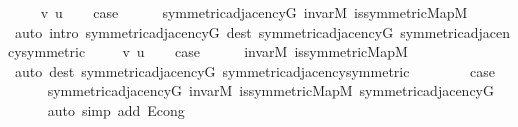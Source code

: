 \begin{isabellebody}
\ \ \isamarkupfalse%
\ {\isacharparenleft}{\kern0pt}{}\ v\ u{\isacharparenright}{\kern0pt}\isanewline
\ \ \isamarkupfalse%
\ {\isacharquery}{\kern0pt}case\isanewline
\ \ \ \ \isamarkupfalse%
\ symmetric{\isacharunderscore}{\kern0pt}adjacency{\isacharunderscore}{\kern0pt}G\ invar{\isacharunderscore}{\kern0pt}M\ is{\isacharunderscore}{\kern0pt}symmetric{\isacharunderscore}{\kern0pt}Map{\isacharunderscore}{\kern0pt}M\isanewline
\ \ \ \ \isamarkupfalse%
\ {\isacharparenleft}{\kern0pt}auto\ intro{\isacharcolon}{\kern0pt}\ symmetric{\isacharunderscore}{\kern0pt}adjacency{\isacharunderscore}{\kern0pt}G{}\ dest{\isacharcolon}{\kern0pt}\ symmetric{\isacharunderscore}{\kern0pt}adjacency{\isacharunderscore}{\kern0pt}G{}\ symmetric{\isacharunderscore}{\kern0pt}adjacency{\isachardot}{\kern0pt}symmetric{\isacharparenright}{\kern0pt}\isanewline
{}\isamarkupfalse%
\isanewline
\ \ \isamarkupfalse%
\ {\isacharparenleft}{\kern0pt}{}\ v\ u{\isacharparenright}{\kern0pt}\isanewline
\ \ \isamarkupfalse%
\ {\isacharquery}{\kern0pt}case\isanewline
\ \ \ \ \isamarkupfalse%
\ invar{\isacharunderscore}{\kern0pt}M\ is{\isacharunderscore}{\kern0pt}symmetric{\isacharunderscore}{\kern0pt}Map{\isacharunderscore}{\kern0pt}M\isanewline
\ \ \ \ \isamarkupfalse%
\ {\isacharparenleft}{\kern0pt}auto\ dest{\isacharcolon}{\kern0pt}\ symmetric{\isacharunderscore}{\kern0pt}adjacency{\isacharunderscore}{\kern0pt}G{}\ symmetric{\isacharunderscore}{\kern0pt}adjacency{\isachardot}{\kern0pt}symmetric{\isacharparenright}{\kern0pt}\isanewline
{}\isamarkupfalse%
\isanewline
\ \ \isamarkupfalse%
\ {}\isanewline
\ \ \isamarkupfalse%
\ {\isacharquery}{\kern0pt}case\isanewline
\ \ \ \ \isamarkupfalse%
\ symmetric{\isacharunderscore}{\kern0pt}adjacency{\isacharunderscore}{\kern0pt}G\ invar{\isacharunderscore}{\kern0pt}M\ is{\isacharunderscore}{\kern0pt}symmetric{\isacharunderscore}{\kern0pt}Map{\isacharunderscore}{\kern0pt}M\ symmetric{\isacharunderscore}{\kern0pt}adjacency{\isacharunderscore}{\kern0pt}G{}\isanewline
\ \ \ \ \isamarkupfalse%
\ {\isacharparenleft}{\kern0pt}auto\ simp\ add{\isacharcolon}{\kern0pt}\ E{}{\isacharunderscore}{\kern0pt}cong{\isacharparenright}{\kern0pt}\isanewline
{}\isamarkupfalse%
\isanewline
\ \ \isamarkupfalse%
\ {}\isanewline

\end{isabellebody}
